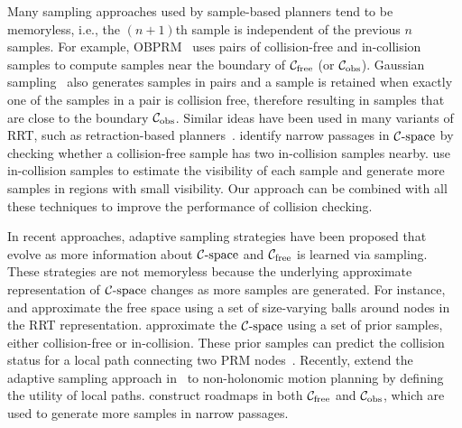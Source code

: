 Many sampling approaches used by sample-based planners tend to be memoryless, i.e., the $(n+1)$th sample is independent of the previous $n$ samples. For example, OBPRM~\cite{Amato:1998:OOP} uses pairs of collision-free and in-collision samples to compute samples near the boundary of $\mathcal C_{\text{free}}$ (or $\mathcal C_{\text{obs}}$).
Gaussian sampling~\cite{Boor:1999:ICRA} also generates samples in pairs and a sample is retained when exactly one of the samples in a pair is collision free, therefore resulting in samples that are close to the boundary $\mathcal C_{\text{obs}}$. Similar ideas have been used in many variants of RRT, such as retraction-based planners~\cite{Hsu:1998:FNP,Rodriguez:2006,Zhang:2008:ICRA}. \cite{Zheng:2005} identify narrow passages in $\mathcal C\text{-space}$ by checking whether a collision-free sample has two in-collision samples nearby. \cite{Kavraki96} use in-collision samples to estimate the visibility of each sample and generate more samples in regions with small visibility. Our approach can be combined with all these techniques to improve the performance of collision checking.

In recent approaches, adaptive sampling strategies have been proposed that evolve as more information about $\mathcal C\text{-space}$ and $\mathcal C_{\text{free}}$ is learned via sampling. These strategies are not memoryless because the underlying approximate representation of $\mathcal C\text{-space}$ changes as more samples are generated. For instance, \cite{Jaillet:2005:IROS} and \cite{Yershova:2005:ICRA} approximate the free space using a set of size-varying balls around nodes in the RRT representation. \cite{Burns-RSS-05} approximate the $\mathcal C\text{-space}$ using a set of prior samples, either collision-free or in-collision. These prior samples can predict the collision status for a local path connecting two PRM nodes~\cite{Burns:2005:ICRA}. Recently, \cite{Knepper:2012:IJRR} extend the adaptive sampling approach in~\cite{Burns-RSS-05} to non-holonomic motion planning by defining the utility of local paths. \cite{Jory:2011:IROS} construct roadmaps in both $\mathcal C_{\text{free}}$ and $\mathcal C_{\text{obs}}$, which are used to generate more samples in narrow passages.


